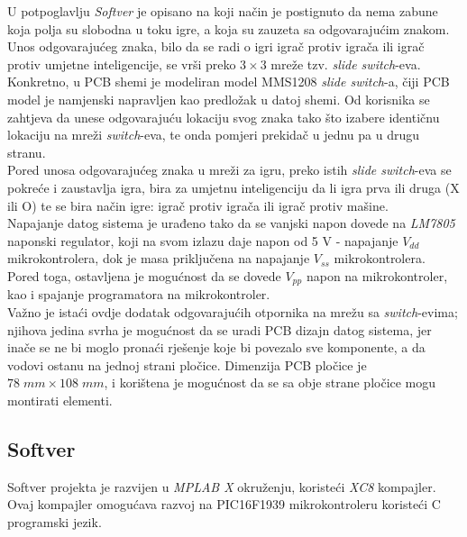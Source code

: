 \documentclass[journal]{IEEE_JAIC}
\begin{document}
U potpoglavlju \textit{Softver} je opisano na koji način je postignuto da nema zabune koja polja su slobodna u toku igre, a koja su zauzeta sa odgovarajućim znakom. \\

Unos odgovarajućeg znaka, bilo da se radi o igri igrač protiv igrača ili igrač protiv umjetne inteligencije, se vrši preko $3\times3$ mreže tzv. \textit{slide switch}-eva. Konkretno, u PCB shemi je modeliran model MMS1208 \textit{slide switch}-a, čiji PCB model je namjenski napravljen kao predložak u datoj shemi. Od korisnika se zahtjeva da unese odgovarajuću lokaciju svog znaka tako što izabere identičnu lokaciju na mreži \textit{switch}-eva, te onda pomjeri prekidač u jednu pa u drugu stranu. \\

Pored unosa odgovarajućeg znaka u mreži za igru, preko istih \textit{slide switch}-eva se pokreće i zaustavlja igra, bira za umjetnu inteligenciju da li igra prva ili druga (X ili O) te se bira način igre: igrač protiv igrača ili igrač protiv mašine. \\

Napajanje datog sistema je urađeno tako da se vanjski napon dovede na \textit{LM7805} naponski regulator, koji na svom izlazu daje napon od 5 V - napajanje $V_{dd}$ mikrokontrolera, dok je masa priključena na napajanje $V_{ss}$ mikrokontrolera. Pored toga, ostavljena je mogućnost da se dovede $V_{pp}$ napon na mikrokontroler, kao i spajanje programatora na mikrokontroler. \\

Važno je istaći ovdje dodatak odgovarajućih otpornika na mrežu sa \textit{switch}-evima; njihova jedina svrha je mogućnost da se uradi PCB dizajn datog sistema, jer inače se ne bi moglo pronaći rješenje koje bi povezalo sve komponente, a da vodovi ostanu na jednoj strani pločice. Dimenzija PCB pločice je $78 \; mm \times 108 \; mm$, i korištena je mogućnost da se sa obje strane pločice mogu montirati elementi. \\

\subsection{Softver}

Softver projekta je razvijen u \textit{MPLAB X} okruženju, koristeći \textit{XC8} kompajler. Ovaj kompajler omogućava razvoj na PIC16F1939 mikrokontroleru koristeći C programski jezik. \\
\end{document}
